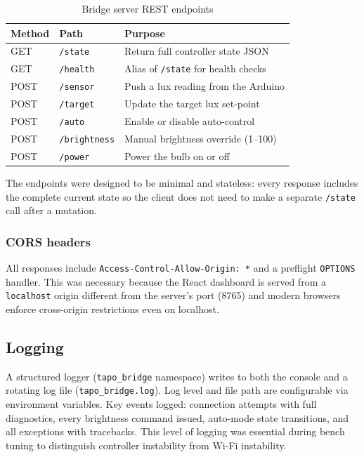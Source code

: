 \documentclass[12pt,letterpaper]{article}
\begin{document}
\begin{table}[H]
  \centering
  \caption{Bridge server REST endpoints}
  \label{tab:endpoints}
  \begin{tabular}{lll}
    \toprule
    \textbf{Method} & \textbf{Path} & \textbf{Purpose} \\
    \midrule
    GET  & \texttt{/state}      & Return full controller state JSON \\
    GET  & \texttt{/health}     & Alias of \texttt{/state} for health checks \\
    POST & \texttt{/sensor}     & Push a lux reading from the Arduino \\
    POST & \texttt{/target}     & Update the target lux set-point \\
    POST & \texttt{/auto}       & Enable or disable auto-control \\
    POST & \texttt{/brightness} & Manual brightness override (1–100) \\
    POST & \texttt{/power}      & Power the bulb on or off \\
    \bottomrule
  \end{tabular}
\end{table}

The endpoints were designed to be minimal and stateless: every response
includes the complete current state so the client does not need to make a
separate \texttt{/state} call after a mutation.

\subsubsection{CORS headers}

All responses include \texttt{Access-Control-Allow-Origin: *} and a preflight
\texttt{OPTIONS} handler. This was necessary because the React dashboard is
served from a \texttt{localhost} origin different from the server's port (8765)
and modern browsers enforce cross-origin restrictions even on localhost.

\subsection{Logging}

A structured logger (\texttt{tapo\_bridge} namespace) writes to both the
console and a rotating log file (\texttt{tapo\_bridge.log}). Log level and
file path are configurable via environment variables. Key events logged:
connection attempts with full diagnostics, every brightness command issued,
auto-mode state transitions, and all exceptions with tracebacks. This level
of logging was essential during bench tuning to distinguish controller
instability from Wi-Fi instability.
\end{document}

